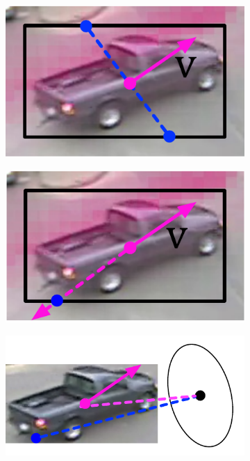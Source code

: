 \begin{figure}
\centering
\begin{subfigure}{0.27\linewidth}
    \includegraphics[width=\linewidth]{./img/semantic_tracker/box_perp_width.pdf}
    \subcaption{}
    \label{subfig:semantic-box-perp-width}
\end{subfigure}
\begin{subfigure}{0.27\linewidth}
    \includegraphics[width=\linewidth]{./img/semantic_tracker/last_pt.pdf}
    \subcaption{}
    \label{subfig:semantic-last-pt}
\end{subfigure}
\begin{subfigure}{0.42\linewidth}
    \includegraphics[width=\linewidth]{./img/semantic_tracker/last_pt_dist.pdf}

\end{subfigure}
\end{figure}

